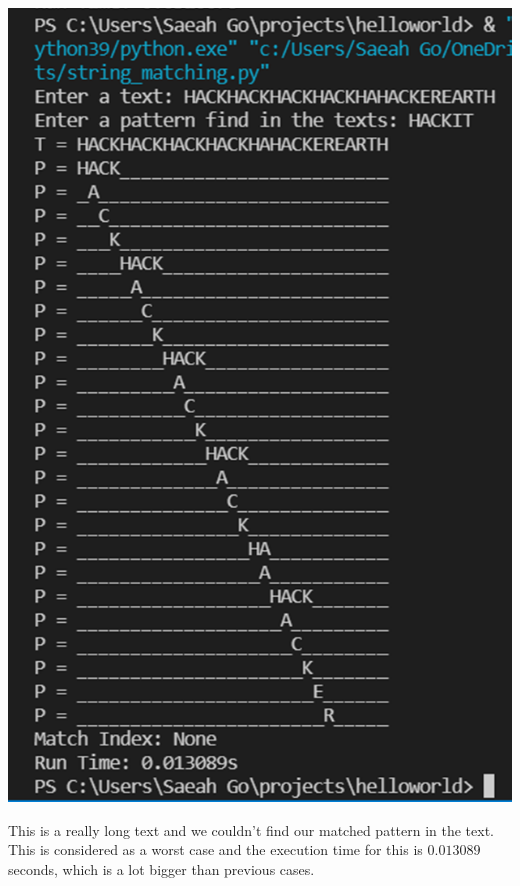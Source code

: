 \documentclass{article}
\begin{document}
\begin{center}
\includegraphics[scale = 0.6]{inputsize 29 worst.png} \\
\end{center}
This is a really long text and we couldn't find our matched pattern in the text. This is considered as a worst case and the execution time for this is $0.013089$ seconds, which is a lot bigger than previous cases.
\end{document}
